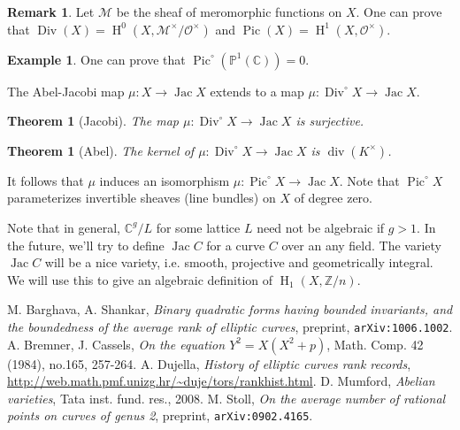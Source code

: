 \documentclass{article}
\DeclareMathOperator{\Div}{Div}
\DeclareMathOperator{\h}{H}
\DeclareMathOperator{\jac}{Jac}
\DeclareMathOperator{\pic}{Pic}
\newtheorem{theorem}[subsection]{Theorem}
\theoremstyle{definition}
\newtheorem{example}[subsection]{Example}
\newtheorem{remark}[subsection]{Remark}
\begin{document}
\begin{remark}
Let $\mathscr{M}$ be the sheaf of meromorphic functions on $X$. One can 
prove that $\Div(X)=\h^0(X,\mathscr{M}^\times/\mathscr{O}^\times)$ and 
$\pic(X)=\h^1(X,\mathscr{O}^\times)$. 
\end{remark}

\begin{example}
One can prove that $\pic^\circ(\mathbb{P}^1(\mathbb{C})) = 0$.
\end{example}

The Abel-Jacobi map $\mu:X\to \jac X$ extends to a map 
$\mu:\Div^\circ X\to \jac X$. 

\begin{theorem}[Jacobi]
The map $\mu:\Div^\circ X\to\jac X$ is surjective.
\end{theorem}

\begin{theorem}[Abel]
The kernel of $\mu:\Div^\circ X\to \jac X$ is $\operatorname{div}(K^\times)$. 
\end{theorem}

It follows that $\mu$ induces an isomorphism $\mu:\pic^\circ X\to \jac X$. 
Note that $\pic^\circ X$ parameterizes invertible sheaves (line bundles) on 
$X$ of degree zero. 

Note that in general, $\mathbb{C}^g/L$ for some lattice $L$ need not be 
algebraic if $g>1$. In the future, we'll try to define $\jac C$ for a curve 
$C$ over an any field. The variety $\jac C$ will be a nice variety, i.e. 
smooth, projective and geometrically integral. We will use this to give an 
algebraic definition of $\h_1(X,\mathbb{Z}/n)$. 










\begin{thebibliography}{9}
   M. Barghava, A. Shankar, \emph{Binary quadratic forms having bounded invariants, and the boundedness of the average rank of elliptic curves}, preprint, \texttt{arXiv:1006.1002}.
   A. Bremner, J. Cassels, \emph{On the equation $Y^2=X(X^2+p)$}, Math. Comp. 42 (1984), no.165, 257-264. 
   A. Dujella, \emph{History of elliptic curves rank records}, \url{http://web.math.pmf.unizg.hr/~duje/tors/rankhist.html}. 
   D. Mumford, \emph{Abelian varieties}, Tata inst. fund. res., 2008. 
   M. Stoll, \emph{On the average number of rational points on curves of genus 2}, preprint, \texttt{arXiv:0902.4165}. 
\end{thebibliography}
\end{document}
